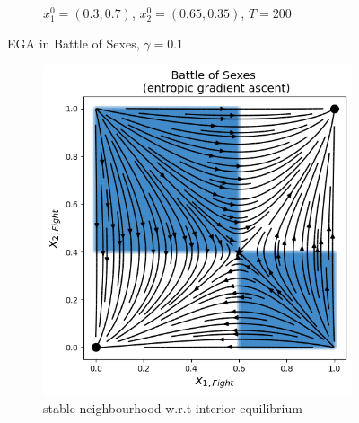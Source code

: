 \begin{figure}[H]
\begin{subfigure}{.5\textwidth}
    \caption{$x_{1}^0 = (0.3,0.7)$, $x_{2}^0 = (0.65,0.35)$, $T = 200$}
    \label{fig:BOS2b}
\end{subfigure}
\caption{EGA in Battle of Sexes, $\gamma = 0.1$}
\label{fig:BOS2}
\end{figure}

\begin{figure}[H]
\captionsetup{justification=centering}
\centering
\begin{subfigure}{.49\textwidth}
    \centering
    \includegraphics[width=\textwidth]{logos/BattleOfSexes6.png}
    \caption{stable neighbourhood w.r.t interior equilibrium}
    \label{fig:BOS3a}
\end{subfigure}%
\begin{subfigure}{.51\textwidth}
    \centering

\end{subfigure}
\end{figure}
